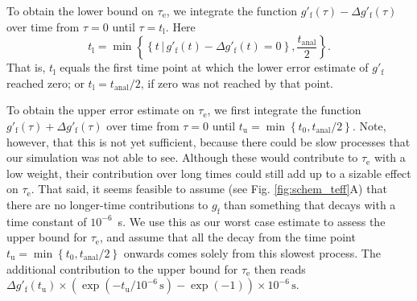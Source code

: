 \documentclass[journal=jpcbfk,manuscript=article,layout=twocolumn]{achemso}
\begin{document}
To obtain the lower bound on $\tau_\mathrm e$, we integrate the function
$g'_{\mathrm{f}}(\tau) - \Delta g'_{\mathrm{f}}(\tau)$ over time from $\tau=0$ until $\tau=t_\mathrm l$.
Here
\begin{equation}
t_\mathrm l= \min
\left\{
	\left\{
		t\,|\,g'_{\mathrm{f}}(t) - \Delta g'_{\mathrm{f}}(t) = 0
	\right\},
	\frac{t_\mathrm{anal}}{2}
\right\}.
\end{equation}
That is,
$t_\mathrm l$ equals
the first time point at which the lower error estimate of $g'_\mathrm f$ reached zero;
or $t_\mathrm l=t_\mathrm{anal}/2$, if zero was not reached by that point.

To obtain the upper error estimate on $\tau_\mathrm e$, we first integrate the function
$g'_{\mathrm{f}}(\tau) + \Delta g'_{\mathrm{f}}(\tau)$ over time from $\tau=0$ until
$
t_\mathrm u= \min
\left\{
	t_0,
	{t_\mathrm{anal}}/{2}
\right\}.
$
Note, however,
that this is not yet sufficient, because there could be slow processes that our simulation was not
able to see. Although these would contribute to $\tau_\mathrm e$ with a low weight,
their contribution over long times could still add up to a sizable effect on $\tau_\mathrm e$.
%
That said, it seems feasible to assume (see Fig. \ref{fig:schem_teff}A) that there are no longer-time contributions
to $g_\mathrm f$ than something that decays with a time constant of $10^{-6}$~s.
%
We use this as our worst case estimate to assess the upper bound for $\tau_\mathrm e$, and
%
assume that all the decay from the time point
$
t_\mathrm u= \min
\left\{
	t_0,
	{t_\mathrm{anal}}/{2}
\right\}
$
onwards comes solely from this slowest process.
%
The additional contribution to the upper bound for $\tau_\mathrm e$ then reads
$
\Delta g'_\mathrm f(t_\mathrm u) \times \left(\exp(-t_\mathrm u / 10^{-6}\,\mathrm s) - \exp(-1)\right) \times 10^{-6}\,\mathrm s.
$

\end{document}
